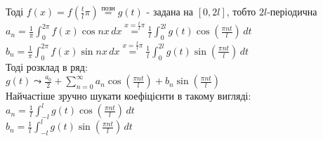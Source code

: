 \documentclass[a4paper, 14pt]{extarticle}
\def\hugespace{\vspace{5mm} \\}
\begin{document}
Тоді $\displaystyle f(x) = f(\frac{t}{l}\pi) \overset{\textrm{позн}}{=} g(t)$ - задана на $[0, 2l]$, тобто $2l$-періодична\\
$\displaystyle a_n = \frac{1}{\pi}\int_0^{2\pi} f(x) \cos nx \,dx \overset{\displaystyle x = \frac{t}{l} \pi}{=} \frac{1}{l} \int_0^{2l} g(t) \cos \left( \frac{\pi n t}{l} \right) \,dt$\\
$\displaystyle b_n = \frac{1}{\pi}\int_0^{2\pi} f(x) \sin nx \,dx \overset{\displaystyle x = \frac{t}{l} \pi}{=} \frac{1}{l} \int_0^{2l} g(t) \sin \left( \frac{\pi n t}{l} \right) \,dt$\\
Тоді розклад в ряд:\\
$\displaystyle g(t) \leadsto \displaystyle \frac{a_0}{2} + \sum_{n=0}^{\infty} a_n \cos \left( \frac{\pi n t}{l} \right) + b_n \sin \left( \frac{\pi n t}{l} \right)$\\
Найчастіше зручно шукати коефіцієнти в такому вигляді:\\
$\displaystyle a_n = \frac{1}{l} \int_{-l}^{l} g(t) \cos \left( \frac{\pi n t}{l} \right) \,dt$\\
$\displaystyle b_n = \frac{1}{l} \int_{-l}^{l} g(t) \sin \left( \frac{\pi n t}{l} \right) \,dt$
\hugespace
\end{document}
